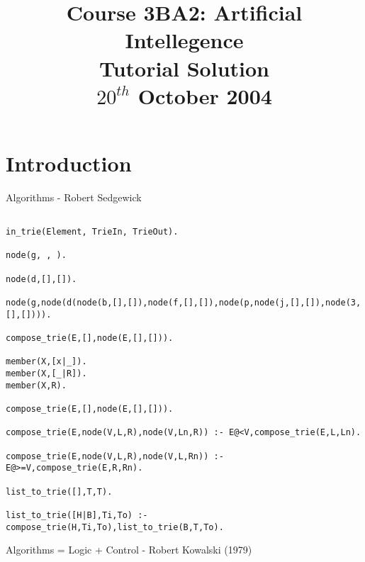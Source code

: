 \documentclass[a4paper,12pt]{article}
\begin{document}
\title{Course 3BA2: Artificial Intellegence \\ Tutorial Solution\\ $20^{th}$ October 2004}

\maketitle

\section{Introduction}

Algorithms - Robert Sedgewick


\begin{verbatim}

in_trie(Element, TrieIn, TrieOut).

node(g, , ).

node(d,[],[]).

node(g,node(d(node(b,[],[]),node(f,[],[]),node(p,node(j,[],[]),node(3,[],[]))).

compose_trie(E,[],node(E,[],[])).

member(X,[x|_]).
member(X,[_|R]).
member(X,R).

compose_trie(E,[],node(E,[],[])).

compose_trie(E,node(V,L,R),node(V,Ln,R)) :- E@<V,compose_trie(E,L,Ln).

compose_trie(E,node(V,L,R),node(V,L,Rn)) :- E@>=V,compose_trie(E,R,Rn).

list_to_trie([],T,T).

list_to_trie([H|B],Ti,To) :- compose_trie(H,Ti,To),list_to_trie(B,T,To).

\end{verbatim}

Algorithms = Logic + Control - Robert Kowalski (1979)
\end{document}
